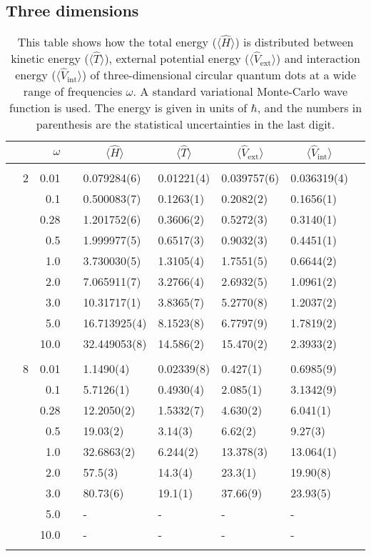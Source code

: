 \subsection{Three dimensions}
\begin{table}[H]
	\caption{This table shows how the total energy ($\langle\hat{H}\rangle$) is distributed between kinetic energy ($\langle\hat{T}\rangle$), external potential energy ($\langle\hat{V}_{\text{ext}}\rangle$) and interaction energy ($\langle\hat{V}_{\text{int}}\rangle$) of three-dimensional circular quantum dots at a wide range of frequencies $\omega$. A standard variational Monte-Carlo wave function is used. The energy is given in units of $\hbar$, and the numbers in parenthesis are the statistical uncertainties in the last digit.}
	\label{tab:splitfrequencyQDVMC3D}
	\begin{tabularx}{\textwidth}{R{1cm}rrcR{2.3cm}R{2.3cm}R{2.3cm}R{2.3cm}R{1cm}} \hline\hline
		&\makecell{\\ \phantom{$N$} \\ \phantom{=}} & $\omega$ &&  &  &  &  & \\ \hline \\
		&2 & 0.01 && 0.079284(6) & 0.01221(4) & 0.039757(6) & 0.036319(4) \\
		&& 0.1 && 0.500083(7) & 0.1263(1) & 0.2082(2) & 0.1656(1) \\
		&& 0.28 && 1.201752(6) & 0.3606(2) & 0.5272(3) & 0.3140(1) \\
		&& 0.5 && 1.999977(5) & 0.6517(3) & 0.9032(3) & 0.4451(1) \\
		&& 1.0 && 3.730030(5) & 1.3105(4) & 1.7551(5) & 0.6644(2) \\
		&& 2.0 && 7.065911(7) & 3.2766(4) & 2.6932(5) & 1.0961(2) \\
		&& 3.0 && 10.31717(1) & 3.8365(7) & 5.2770(8) & 1.2037(2) \\ 
		&& 5.0 && 16.713925(4) & 8.1523(8) & 6.7797(9) & 1.7819(2) \\
		&& 10.0 && 32.449053(8) & 14.586(2) & 15.470(2) & 2.3933(2) \\
		\hdashline \\
		
		&8 & 0.01 && 1.1490(4) & 0.02339(8) & 0.427(1) & 0.6985(9) \\
		&& 0.1 && 5.7126(1) & 0.4930(4) & 2.085(1) & 3.1342(9) \\
		&& 0.28 && 12.2050(2) & 1.5332(7) & 4.630(2) & 6.041(1) \\
		&& 0.5 && 19.03(2) & 3.14(3) & 6.62(2) & 9.27(3) \\
		&& 1.0 && 32.6863(2) & 6.244(2) & 13.378(3) & 13.064(1) \\
		&& 2.0 && 57.5(3) & 14.3(4) & 23.3(1) & 19.90(8) \\
		&& 3.0 && 80.73(6) & 19.1(1) & 37.66(9) & 23.93(5) \\ 
		&& 5.0 && - & - & - & -\\
		&& 10.0 && - & - & - & -\\
		\hdashline \\
		

\end{tabularx}
\end{table}
